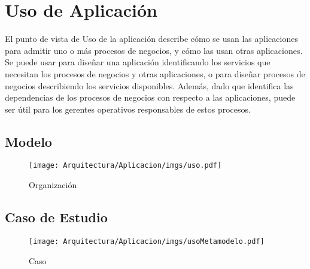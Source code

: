\section{Uso de Aplicación}
El punto de vista de Uso de la aplicación describe cómo se usan las aplicaciones para admitir uno o más procesos de negocios, y cómo las usan otras aplicaciones. Se puede usar para diseñar una aplicación identificando los servicios que necesitan los procesos de negocios y otras aplicaciones, o para diseñar procesos de negocios describiendo los servicios disponibles. Además, dado que identifica las dependencias de los procesos de negocios con respecto a las aplicaciones, puede ser útil para los gerentes operativos responsables de estos procesos.
\subsection{Modelo}
\begin{figure}[h!]
	\centering
	\texttt{[image: Arquitectura/Aplicacion/imgs/uso.pdf]}
	\caption{Organización}
\end{figure}
\newpage
\subsection{Caso de Estudio}

\begin{figure}[h!]
	\centering
	\texttt{[image: Arquitectura/Aplicacion/imgs/usoMetamodelo.pdf]}
	\caption{Caso}
\end{figure}